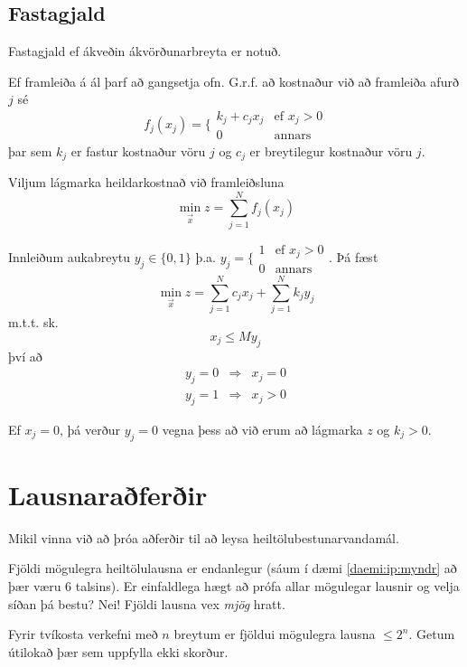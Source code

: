 \subsection{Fastagjald}
Fastagjald ef ákveðin ákvörðunarbreyta er notuð.
\begin{daemi} Ef framleiða á ál þarf að gangsetja ofn. G.r.f. að kostnaður við að framleiða afurð $j$ sé 
$$f_j(x_j)=\Bigg\{\begin{array}{cl}k_j+c_jx_j & \mbox{ef } x_j>0\\0 &\mbox{annars}\end{array}$$
þar sem $k_j$ er fastur kostnaður vöru $j$ og $c_j$ er breytilegur kostnaður vöru $j$.

Viljum lágmarka heildarkostnað við framleiðsluna 
$$\min_{\vec{x}} z  =  \sum_{j=1}^N f_j(x_j)$$

\end{daemi}
\begin{lausn}Innleiðum aukabreytu $y_j\in\{0,1\}$ þ.a. $y_j=\Bigg\{\begin{array}{cl} 1 & \mbox{ef } x_j>0\\0 &\mbox{annars}\end{array}$. Þá fæst 
$$\min_{\vec{x}} z  =  \sum_{j=1}^N c_j x_j + \sum_{j=1}^N k_j y_j $$
m.t.t. sk. 
$$x_j \leq M y_j  $$
því að 
\[\begin{matrix}y_j=0 & \Rightarrow & x_j=0 \\y_j=1 & \Rightarrow & x_j>0 \end{matrix} \]
\begin{aths}Ef $x_j=0$, þá verður $y_j=0$ vegna þess að við erum að lágmarka $z$ og $k_j>0$.\end{aths}
\end{lausn}

\section{Lausnaraðferðir}
Mikil vinna við að þróa aðferðir til að leysa heiltölubestunarvandamál.

Fjöldi mögulegra heiltölulausna er endanlegur (sáum í dæmi \ref{daemi:ip:myndr} að þær væru 6 talsins). Er einfaldlega hægt að prófa allar mögulegar lausnir og velja síðan þá bestu? Nei! Fjöldi lausna vex \emph{mjög} hratt.

Fyrir tvíkosta verkefni með $n$ breytum er fjöldui mögulegra lausna $\leq 2^n$. Getum útilokað þær sem uppfylla ekki skorður.

